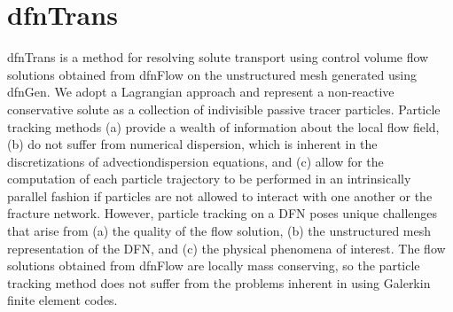 \documentclass[letterpaper,10pt,english]{sphinxmanual}
\begin{document}
\begin{sphinxVerbatim}[commandchars=\\\{\}]
 
     
   

   
   


 
   
   

 
   
   

   
   

\end{sphinxVerbatim}


\chapter{dfnTrans}
\label{\detokenize{dfntrans:dfntrans}}\label{\detokenize{dfntrans:dftrans-chapter}}\label{\detokenize{dfntrans::doc}}
dfnTrans is a method for resolving solute transport using control volume flow
solutions obtained from dfnFlow on the unstructured mesh generated using dfnGen.
We adopt a Lagrangian approach and represent a non-reactive conservative solute
as a collection of indivisible passive tracer particles. Particle tracking
methods (a) provide a wealth of information about the local flow field, (b) do
not suffer from numerical dispersion, which is inherent in the discretizations
of advection\textendash{}dispersion equations, and (c) allow for the computation of each
particle trajectory to be performed in an intrinsically parallel fashion if
particles are not allowed to interact with one another or the fracture network.
However, particle tracking on a DFN poses unique challenges that arise from (a)
the quality of the flow solution, (b) the unstructured mesh representation of
the DFN, and (c) the physical phenomena of interest. The flow solutions obtained
from dfnFlow are locally mass conserving, so the particle tracking method does
not suffer from the problems inherent in using Galerkin finite element codes.
\end{document}
